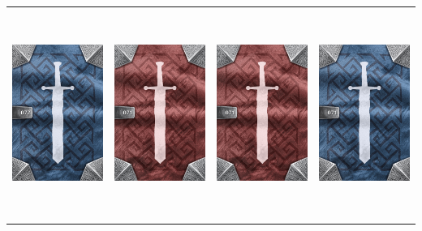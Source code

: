 \documentclass{minimal}
\begin{document}
{\begin{longtable}{llll}
\includegraphics[width=44mm,height=68mm]{./64-151/gh-072a-shoes-of-happiness-back.png} &
\includegraphics[width=44mm,height=68mm]{./64-151/gh-071b-boots-of-levitation-back.png} &
\includegraphics[width=44mm,height=68mm]{./64-151/gh-071b-boots-of-levitation-back.png} &
\includegraphics[width=44mm,height=68mm]{./64-151/gh-071a-boots-of-levitation-back.png}\\ 

\end{longtable}}
\end{document}
